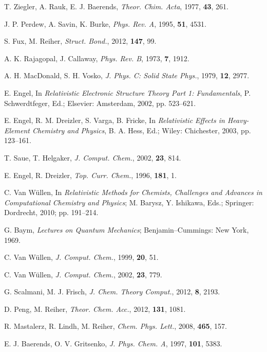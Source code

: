 \documentclass[%
 preprint, linenumbers,
 amsmath,amssymb,
 aps, physrev,
]{revtex4-2}
\begin{document}
\begin{thebibliography}{144}
 T. Ziegler, A. Rauk, E. J. Baerends, \textit{Theor. Chim. Acta}, 1977, \textbf{43}, 261.

 J. P. Perdew, A. Savin, K. Burke, \textit{Phys. Rev. A}, 1995, \textbf{51}, 4531.

 S. Fux, M. Reiher, \textit{Struct. Bond.}, 2012, \textbf{147}, 99.

 A. K. Rajagopal, J. Callaway, \textit{Phys. Rev. B}, 1973, \textbf{7}, 1912.

 A. H. MacDonald, S. H. Vosko, \textit{J. Phys. C: Solid State Phys.}, 1979, \textbf{12}, 2977.

 E. Engel, In \textit{Relativistic Electronic Structure Theory Part 1: Fundamentals}, P. Schwerdtfeger, Ed.; Elsevier: Amsterdam, 2002, pp. 523–621.

 E. Engel, R. M. Dreizler, S. Varga, B. Fricke, In \textit{Relativistic Effects in Heavy-Element Chemistry and Physics}, B. A. Hess, Ed.; Wiley: Chichester, 2003, pp. 123–161.

 T. Saue, T. Helgaker, \textit{J. Comput. Chem.}, 2002, \textbf{23}, 814.

 E. Engel, R. Dreizler, \textit{Top. Curr. Chem.}, 1996, \textbf{181}, 1.

 C. Van Wüllen, In \textit{Relativistic Methods for Chemists, Challenges and Advances in Computational Chemistry and Physics}; M. Barysz, Y. Ishikawa, Eds.; Springer: Dordrecht, 2010; pp. 191–214.

 G. Baym, \textit{Lectures on Quantum Mechanics}; Benjamin–Cummings: New York, 1969.

 C. Van Wüllen, \textit{J. Comput. Chem.}, 1999, \textbf{20}, 51.

 C. Van Wüllen, \textit{J. Comput. Chem.}, 2002, \textbf{23}, 779.

 G. Scalmani, M. J. Frisch, \textit{J. Chem. Theory Comput.}, 2012, \textbf{8}, 2193.

 D. Peng, M. Reiher, \textit{Theor. Chem. Acc.}, 2012, \textbf{131}, 1081.

 R. Mastalerz, R. Lindh, M. Reiher, \textit{Chem. Phys. Lett.}, 2008, \textbf{465}, 157.

 E. J. Baerends, O. V. Gritsenko, \textit{J. Phys. Chem. A}, 1997, \textbf{101}, 5383.



\end{thebibliography}
\end{document}
